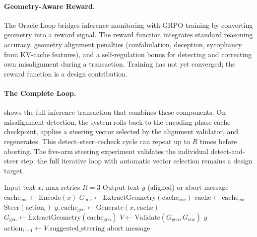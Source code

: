 \paragraph{Geometry-Aware Reward.}
The Oracle Loop bridges inference monitoring with GRPO training by
converting geometry into a reward signal. The reward function integrates
standard reasoning accuracy, geometry alignment penalties (confabulation,
deception, sycophancy from KV-cache features), and a self-regulation
bonus for detecting and correcting own misalignment during a transaction.
Training has not yet converged; the reward function is a design
contribution.

\paragraph{The Complete Loop.}
 shows the full inference transaction that
combines these components. On misalignment detection, the system rolls
back to the encoding-phase cache checkpoint, applies a steering vector
selected by the alignment validator, and regenerates. This
detect--steer--recheck cycle can repeat up to $R$ times before aborting.
The five-arm steering experiment validates the individual
detect-and-steer step; the full iterative loop with automatic vector
selection remains a design target.

\begin{algorithm}[H]
\caption{Oracle Loop Inference Transaction}\label{alg:oracle_loop}
\begin{algorithmic}[1]
\Require Input text $x$, max retries $R = 3$
\Ensure Output text $y$ (aligned) or abort message
\State $\text{cache}_{\text{enc}} \gets \text{Encode}(x)$
\State $G_{\text{enc}} \gets \text{ExtractGeometry}(\text{cache}_{\text{enc}})$
    \State $\text{cache} \gets \text{cache}_{\text{enc}}$
    \State $\text{Steer}(\text{action}_i)$
  \EndIf
  \State $y, \text{cache}_{\text{gen}} \gets \text{Generate}(x, \text{cache})$
  \State $G_{\text{gen}} \gets \text{ExtractGeometry}(\text{cache}_{\text{gen}})$
  \State $V \gets \text{Validate}(G_{\text{gen}}, G_{\text{enc}})$
    \State \Return $y$
    \State $\text{action}_{i+1} \gets V.\text{suggested\_steering}$
  \EndIf
\EndFor
\State \Return abort message 
\end{algorithmic}
\end{algorithm}

